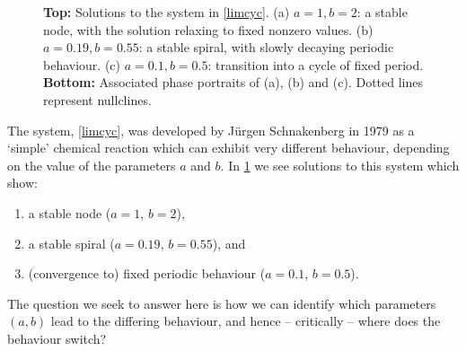 \documentclass[main.tex]{subfiles}
\begin{document}
\begin{figure}
\begin{subfigure}[t]{0.32\textwidth}
	\centering
	
\end{subfigure}
\begin{subfigure}[t]{0.32\textwidth}
	\centering
	
\end{subfigure}
\begin{subfigure}[t]{0.32\textwidth}
	\centering
	
\end{subfigure}
\begin{subfigure}[t]{0.32\textwidth}
	\centering
	
\end{subfigure}
\begin{subfigure}[t]{0.32\textwidth}
	\centering
	
\end{subfigure}
\begin{subfigure}[t]{0.32\textwidth}
	\centering
	
\end{subfigure}
\caption{\textbf{Top:} Solutions to the system in \cref{limcyc}. (a) $a=1,b=2$: a stable node, with the solution relaxing to fixed nonzero values. (b) $a= 0.19, b=0.55$: a stable spiral, with slowly decaying periodic behaviour. (c) $a=0.1,b=0.5$: transition into a cycle of fixed period. \textbf{Bottom:} Associated phase portraits of (a), (b) and (c). Dotted lines represent nullclines.}
\label{limc}
\end{figure} 

The system, \cref{limcyc}, was developed by Jürgen Schnakenberg in 1979 as a `simple' chemical reaction which can exhibit very different behaviour, depending on the value of the parameters $a$ and $b$. In \cref{limc} we see solutions to this system which show:%
\begin{enumerate}[label=(\alph*)]%
	\item a stable node ($a=1$, $b=2$),
	\item a stable spiral ($a= 0.19$, $b=0.55$), and 
	\item (convergence to) fixed periodic behaviour ($a=0.1$, $b=0.5$).
\end{enumerate}

The question we seek to answer here is how we can identify which parameters $(a,b)$ lead to the differing behaviour, and hence -- critically -- where does the behaviour switch? 
\end{document}
